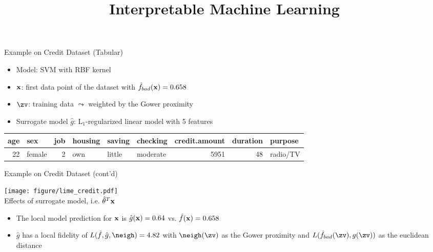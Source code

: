 \documentclass[10pt,compress,t,notes=noshow, xcolor=table]{beamer}
\title{Interpretable Machine Learning}
\date{}
\newcommand{\pih}{\fh}
\newcommand{\gh}{\hat{g}}
\begin{document}
	








\begin{frame}[c]{Example on Credit Dataset (Tabular)}
	\begin{itemize}
		\item Model: SVM with RBF kernel
		\item $\mathbf{x}$: first data point of the dataset with $\hat{f}_{bad}(\mathbf{x}) = 0.658$
		\item $\zv$: training data $\leadsto$ weighted by the Gower proximity 
		\item Surrogate model $\gh$: L$_1$-regularized linear model with 5 features 
	\end{itemize}

    \bigskip

	\begin{table}[ht]
		\centering
		\scriptsize
		\begin{tabular}{rlrlllrrl}
			\hline
			age & sex & job & housing & saving & checking & credit.amount & duration & purpose \\ 
			\hline
			 22 & female &   2 & own & little & moderate & 5951 &  48 & radio/TV \\ 
			\hline
		\end{tabular}
	\end{table}

\end{frame}

\begin{frame}[c]{Example on Credit Dataset (cont'd)}


\begin{center}
	\texttt{[image: figure/lime\_credit.pdf]}\\
	{Effects of surrogate model, i.e. $\hat{\theta}^T \mathbf{x}$}
\end{center}

\begin{itemize}
	\item The local model prediction for $\mathbf{x}$ is $\gh(\xv) = 0.64$ vs. $\hat{f}(\mathbf{x}) = 0.658$ 
	\item $\gh$ has a local fidelity of $L(\pih, \gh, \neigh) = 4.82$ with $\neigh(\zv)$ as the Gower proximity and $L(\pih_{bad}(\zv), g(\zv))$ as the euclidean distance 
\end{itemize}

\end{frame}
	
\end{document}

